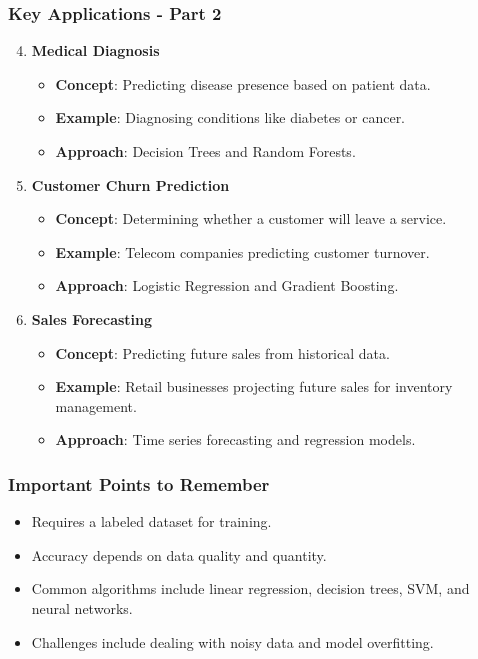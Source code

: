 \documentclass[aspectratio=169]{beamer}
\begin{document}
\begin{frame}
    \frametitle{Key Applications - Part 2}
    \begin{enumerate}
        \setcounter{enumi}{3}
        \item \textbf{Medical Diagnosis}
            \begin{itemize}
                \item \textbf{Concept}: Predicting disease presence based on patient data.
                \item \textbf{Example}: Diagnosing conditions like diabetes or cancer.
                \item \textbf{Approach}: Decision Trees and Random Forests.
            \end{itemize}

        \item \textbf{Customer Churn Prediction}
            \begin{itemize}
                \item \textbf{Concept}: Determining whether a customer will leave a service.
                \item \textbf{Example}: Telecom companies predicting customer turnover.
                \item \textbf{Approach}: Logistic Regression and Gradient Boosting.
            \end{itemize}

        \item \textbf{Sales Forecasting}
            \begin{itemize}
                \item \textbf{Concept}: Predicting future sales from historical data.
                \item \textbf{Example}: Retail businesses projecting future sales for inventory management.
                \item \textbf{Approach}: Time series forecasting and regression models.
            \end{itemize}
    \end{enumerate}
\end{frame}

\begin{frame}
    \frametitle{Important Points to Remember}
    \begin{itemize}
        \item Requires a labeled dataset for training.
        \item Accuracy depends on data quality and quantity.
        \item Common algorithms include linear regression, decision trees, SVM, and neural networks.
        \item Challenges include dealing with noisy data and model overfitting.
    \end{itemize}
\end{frame}
\end{document}
